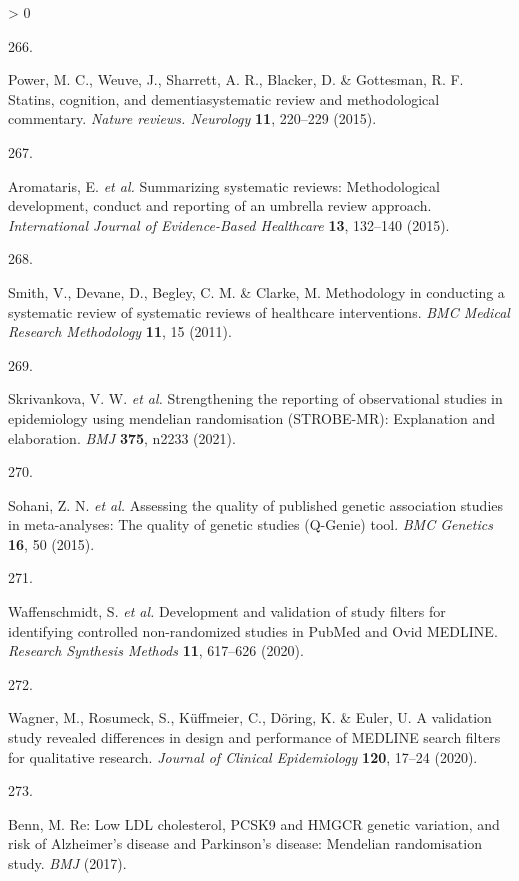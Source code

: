 \documentclass[a4paper, twoside]{templates/ociamthesis}
\newlength{\cslhangindent}
\newlength{\csllabelwidth}
\newenvironment{CSLReferences}[3] %
 {%
  \setlength{\parindent}{0pt}
  \ifodd #1 \everypar{\setlength{\hangindent}{\cslhangindent}}\ignorespaces\fi
  \ifnum #2 > 0
  \setlength{\parskip}{#2\baselineskip}
  \fi
 }%
 {}
\newcommand{\CSLLeftMargin}[1]{\parbox[t]{\maxof{\widthof{#1}}{\csllabelwidth}}{#1}}
\newcommand{\CSLRightInline}[1]{\parbox[t]{\linewidth - \csllabelwidth}{#1}}
\begin{document}
\begin{CSLReferences}{0}{0}
\leavevmode\hypertarget{ref-power2015}{}%
\CSLLeftMargin{266. }
\CSLRightInline{Power, M. C., Weuve, J., Sharrett, A. R., Blacker, D. \& Gottesman, R. F. Statins, cognition, and dementia{}systematic review and methodological commentary. \emph{Nature reviews. Neurology} \textbf{11}, 220--229 (2015).}

\leavevmode\hypertarget{ref-aromataris2015}{}%
\CSLLeftMargin{267. }
\CSLRightInline{Aromataris, E. \emph{et al.} Summarizing systematic reviews: Methodological development, conduct and reporting of an umbrella review approach. \emph{International Journal of Evidence-Based Healthcare} \textbf{13}, 132--140 (2015).}

\leavevmode\hypertarget{ref-smith2011}{}%
\CSLLeftMargin{268. }
\CSLRightInline{Smith, V., Devane, D., Begley, C. M. \& Clarke, M. Methodology in conducting a systematic review of systematic reviews of healthcare interventions. \emph{BMC Medical Research Methodology} \textbf{11}, 15 (2011).}

\leavevmode\hypertarget{ref-skrivankova2021}{}%
\CSLLeftMargin{269. }
\CSLRightInline{Skrivankova, V. W. \emph{et al.} Strengthening the reporting of observational studies in epidemiology using mendelian randomisation ({STROBE}-{MR}): Explanation and elaboration. \emph{BMJ} \textbf{375}, n2233 (2021).}

\leavevmode\hypertarget{ref-sohani2015}{}%
\CSLLeftMargin{270. }
\CSLRightInline{Sohani, Z. N. \emph{et al.} Assessing the quality of published genetic association studies in meta-analyses: The quality of genetic studies ({Q}-{Genie}) tool. \emph{BMC Genetics} \textbf{16}, 50 (2015).}

\leavevmode\hypertarget{ref-waffenschmidt2020}{}%
\CSLLeftMargin{271. }
\CSLRightInline{Waffenschmidt, S. \emph{et al.} Development and validation of study filters for identifying controlled non-randomized studies in {PubMed} and {Ovid MEDLINE}. \emph{Research Synthesis Methods} \textbf{11}, 617--626 (2020).}

\leavevmode\hypertarget{ref-wagner2020}{}%
\CSLLeftMargin{272. }
\CSLRightInline{Wagner, M., Rosumeck, S., Küffmeier, C., Döring, K. \& Euler, U. A validation study revealed differences in design and performance of {MEDLINE} search filters for qualitative research. \emph{Journal of Clinical Epidemiology} \textbf{120}, 17--24 (2020).}

\leavevmode\hypertarget{ref-benn2017comment}{}%
\CSLLeftMargin{273. }
\CSLRightInline{Benn, M. Re: Low {LDL} cholesterol, {PCSK9} and {HMGCR} genetic variation, and risk of {Alzheimer}'s disease and {Parkinson}'s disease: Mendelian randomisation study. \emph{BMJ} (2017).}


\end{CSLReferences}
\end{document}
